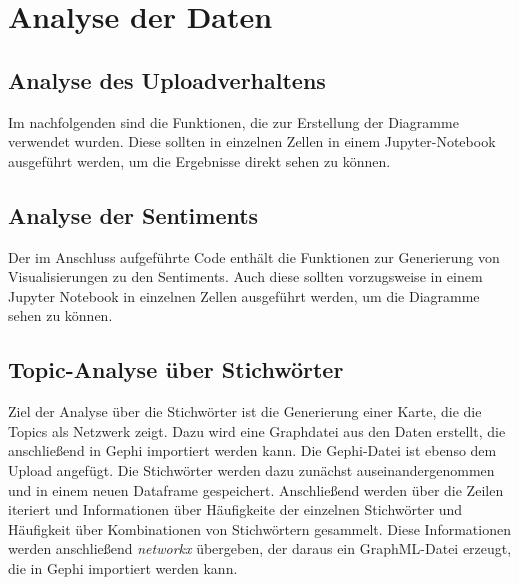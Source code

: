 \documentclass[12pt]{article}
\begin{document}
\begin{sloppypar}
	


	\section{Analyse der Daten}

	\subsection{Analyse des Uploadverhaltens}

	Im nachfolgenden sind die Funktionen, die zur Erstellung der Diagramme
	verwendet wurden. Diese sollten in einzelnen Zellen in einem
	Jupyter-Notebook ausgeführt werden, um die Ergebnisse direkt sehen zu
	können.

	

	\subsection{Analyse der Sentiments}

	Der im Anschluss aufgeführte Code enthält die Funktionen zur Generierung von
	Visualisierungen zu den Sentiments. Auch diese sollten vorzugsweise in einem
	Jupyter Notebook in einzelnen Zellen ausgeführt werden, um die Diagramme
	sehen zu können.

	

	\subsection{Topic-Analyse über Stichwörter}

	Ziel der Analyse über die Stichwörter ist die Generierung einer Karte, die
	die Topics als Netzwerk zeigt. Dazu wird eine Graphdatei aus den Daten
	erstellt, die anschließend in Gephi importiert werden kann. Die Gephi-Datei
	ist ebenso dem Upload angefügt. Die Stichwörter werden dazu zunächst
	auseinandergenommen und in einem neuen Dataframe gespeichert. Anschließend
	werden über die Zeilen iteriert und Informationen über Häufigkeite der
	einzelnen Stichwörter und Häufigkeit über Kombinationen von Stichwörtern
	gesammelt. Diese Informationen werden anschließend \emph{networkx}
	übergeben, der daraus ein GraphML-Datei erzeugt, die in Gephi importiert
	werden kann.


\end{sloppypar}
\end{document}
